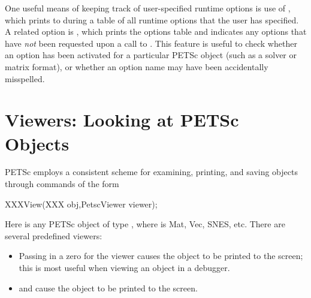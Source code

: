 {{{One useful means of keeping track of user-specified runtime options is
use of , which prints to  during  a table of all runtime options that the user has
specified.   A related option is ,
 which prints the options table and indicates
any options that have {\em not} been requested upon a call to .  This feature is useful to check whether an option
has been activated for a particular PETSc object (such as a solver or
matrix format), or whether an option name may have been accidentally
misspelled.

\section{Viewers: Looking at PETSc Objects} \label{sec_viewers}

PETSc employs a consistent scheme for examining, printing, and 
saving objects through commands of the form
\begin{tabbing}
  XXXView(XXX obj,PetscViewer viewer);
\end{tabbing}
Here  is any PETSc object of type
,  where  
is Mat, Vec, SNES, etc. There are several
predefined viewers:
\begin{itemize}
\item Passing in a zero for the viewer causes the object to be printed 
      to the screen; this is most useful when viewing an object in 
      a debugger.
\item {}  and 
       
      cause the object to be printed to the screen.


\end{itemize}}}}
